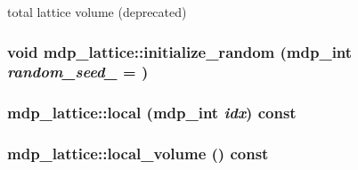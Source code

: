 total lattice volume (deprecated) \hypertarget{classmdp__lattice_a1d9c9be3661c7e0ccd05d9c1ed620178}{
\subsubsection[{initialize\_\-random}]{\setlength{\rightskip}{0pt plus 5cm}void mdp\_\-lattice::initialize\_\-random ({\bf mdp\_\-int} {\em random\_\-seed\_\-} = {})}}
\label{classmdp__lattice_a1d9c9be3661c7e0ccd05d9c1ed620178}
\hypertarget{classmdp__lattice_a9b2c219bd0fb16482508b87839d02e9b}{
\subsubsection[{local}]{ mdp\_\-lattice::local ({\bf mdp\_\-int} {\em idx}) const}}
\label{classmdp__lattice_a9b2c219bd0fb16482508b87839d02e9b}
\hypertarget{classmdp__lattice_acc39e2cd011b6ebc5cc527fbdfc03ec6}{
\subsubsection[{local\_\-volume}]{ mdp\_\-lattice::local\_\-volume () const}}
\label{classmdp__lattice_acc39e2cd011b6ebc5cc527fbdfc03ec6}


